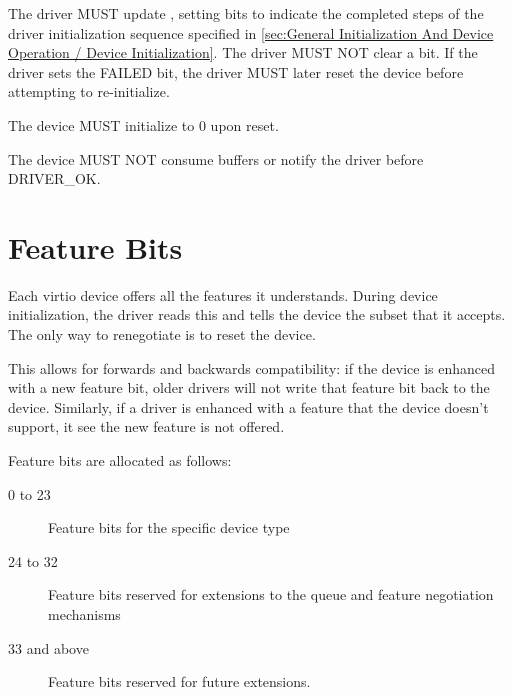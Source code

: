 The driver MUST update ,
setting bits to indicate the completed steps of the driver
initialization sequence specified in
\ref{sec:General Initialization And Device Operation / Device
Initialization}.
The driver MUST NOT clear a
 bit.  If the driver sets the FAILED bit,
the driver MUST later reset the device before attempting to re-initialize.

The device MUST initialize  to 0 upon reset.

The device MUST NOT consume buffers or notify the driver before DRIVER_OK.

\section{Feature Bits}\label{sec:Basic Facilities of a Virtio Device / Feature Bits}

Each virtio device offers all the features it understands.  During
device initialization, the driver reads this and tells the device the
subset that it accepts.  The only way to renegotiate is to reset
the device.

This allows for forwards and backwards compatibility: if the device is
enhanced with a new feature bit, older drivers will not write that
feature bit back to the device.  Similarly, if a driver is enhanced with a feature
that the device doesn't support, it see the new feature is not offered.

Feature bits are allocated as follows:

\begin{description}
\item[0 to 23] Feature bits for the specific device type

\item[24 to 32] Feature bits reserved for extensions to the queue and
  feature negotiation mechanisms

\item[33 and above] Feature bits reserved for future extensions.
\end{description}

